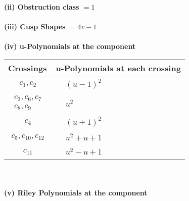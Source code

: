 \documentclass[1p]{elsarticle_modified}
\theoremstyle{definition}
\begin{document}
\flushleft \textbf{(ii) Obstruction class $= 1$}\\~\\
\flushleft \textbf{(iii) Cusp Shapes $= 4 v-1$}\\~\\
\newpage\renewcommand{\arraystretch}{1}
\flushleft \textbf{(iv) u-Polynomials at the component}\newline \\
\begin{tabular}{m{50pt}|m{274pt}}
Crossings & \hspace{64pt}u-Polynomials at each crossing \\
\hline $$\begin{aligned}c_{1},c_{2}\end{aligned}$$&$\begin{aligned}
&(u-1)^2
\end{aligned}$\\
\hline $$\begin{aligned}c_{3},c_{6},c_{7}\\c_{8},c_{9}\end{aligned}$$&$\begin{aligned}
&u^2
\end{aligned}$\\
\hline $$\begin{aligned}c_{4}\end{aligned}$$&$\begin{aligned}
&(u+1)^2
\end{aligned}$\\
\hline $$\begin{aligned}c_{5},c_{10},c_{12}\end{aligned}$$&$\begin{aligned}
&u^2+u+1
\end{aligned}$\\
\hline $$\begin{aligned}c_{11}\end{aligned}$$&$\begin{aligned}
&u^2- u+1
\end{aligned}$\\
\hline
\end{tabular}\\~\\
\newpage\renewcommand{\arraystretch}{1}
\flushleft \textbf{(v) Riley Polynomials at the component}\newline \\
\end{document}
